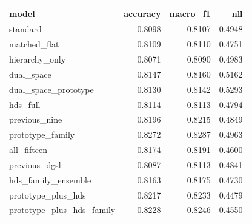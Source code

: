 \begin{tabular}{lrrr}
\toprule
model & accuracy & macro\_f1 & nll \\
\midrule
standard & 0.8098 & 0.8107 & 0.4948 \\
matched\_flat & 0.8109 & 0.8110 & 0.4751 \\
hierarchy\_only & 0.8071 & 0.8090 & 0.4983 \\
dual\_space & 0.8147 & 0.8160 & 0.5162 \\
dual\_space\_prototype & 0.8130 & 0.8142 & 0.5293 \\
hds\_full & 0.8114 & 0.8113 & 0.4794 \\
previous\_nine & 0.8196 & 0.8215 & 0.4849 \\
prototype\_family & 0.8272 & 0.8287 & 0.4963 \\
all\_fifteen & 0.8174 & 0.8191 & 0.4600 \\
previous\_dgsl & 0.8087 & 0.8113 & 0.4841 \\
hds\_family\_ensemble & 0.8163 & 0.8175 & 0.4730 \\
prototype\_plus\_hds & 0.8217 & 0.8233 & 0.4479 \\
prototype\_plus\_hds\_family & 0.8228 & 0.8246 & 0.4550 \\
\bottomrule
\end{tabular}
